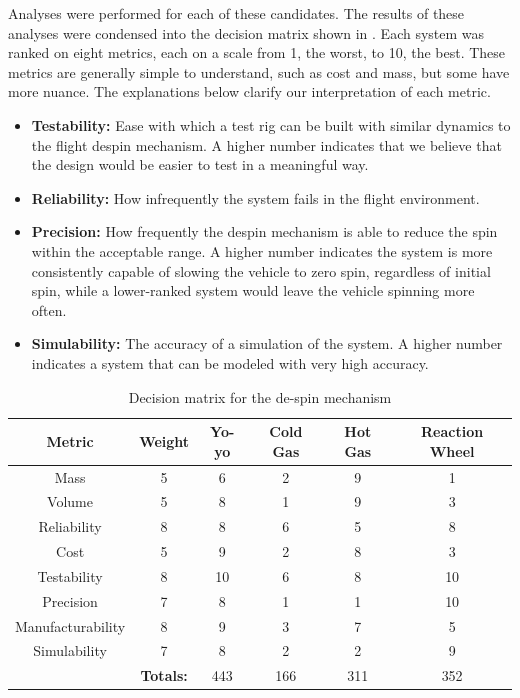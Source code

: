 Analyses were performed for each of these candidates. The results of these analyses were condensed into the decision matrix shown in . Each system was ranked on eight metrics, each on a scale from 1, the worst, to 10, the best. These metrics are generally simple to understand, such as cost and mass, but some have more nuance. The explanations below clarify our interpretation of each metric.

\begin{itemize}
    \item \textbf{Testability:} Ease with which a test rig can be built with similar dynamics to the flight despin mechanism. A higher number indicates that we believe that the design would be easier to test in a meaningful way.
    \item \textbf{Reliability:} How infrequently the system fails in the flight environment.
    \item \textbf{Precision:} How frequently the despin mechanism is able to reduce the spin within the acceptable range. A higher number indicates the system is more consistently capable of slowing the vehicle to zero spin, regardless of initial spin, while a lower-ranked system would leave the vehicle spinning more often.
    \item \textbf{Simulability:} The accuracy of a simulation of the system. A higher number indicates a system that can be modeled with very high accuracy.
\end{itemize}

\begin{table}
    \centering
    \begin{tabular}{cc||cccc}
        \textbf{Metric} & \textbf{Weight} & Yo-yo & Cold Gas & Hot Gas & Reaction Wheel \\ \hline
        Mass & 5 & 6 & 2 & 9 & 1 \\ %
        Volume & 5 & 8 & 1 & 9 & 3 \\ %
        Reliability & 8 & 8 & 6 & 5 & 8 \\ %
        Cost & 5 & 9 & 2 & 8 & 3 \\ %
        Testability & 8 & 10 & 6 & 8 & 10 \\ %
        Precision & 7 & 8 & 1 & 1 & 10 \\ %
        Manufacturability & 8 & 9 & 3 & 7 & 5 \\ %
        Simulability & 7 & 8 & 2 & 2 & 9 \\ \hline 
         & \textbf{Totals:} & 443 & 166 & 311 & 352
    \end{tabular}
    \caption{Decision matrix for the de-spin mechanism}
    \label{table:despin-design-matrix}
\end{table}

